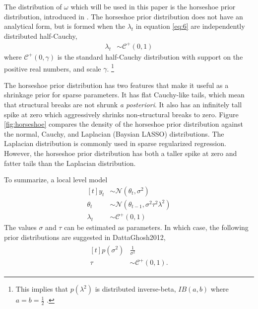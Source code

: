 \documentclass{article}
\newcommand{\paren}[1]{\ensuremath{\left(#1\right)}}
\newcommand{\dnorm}[1]{\ensuremath{\mathcal{N}\paren{#1}}}
\newcommand{\dhalfcauchy}[1]{\ensuremath{\mathcal{C}^{+}\paren{#1}}}
\begin{document}
\begin{itemize}
The distribution of $\omega$ which will be used in this paper is the horseshoe prior distribution, introduced in \textcites{CarvalhoPolsonScott2009}{CarvalhoPolsonScott2010}.
The horseshoe prior distribution does not have an analytical form, but is formed when the $\lambda_{t}$ in equation \eqref{eq:6} are independently distributed half-Cauchy,
\begin{align}
  \label{eq:13}
  \lambda_{t} &\sim \dhalfcauchy{0, 1}
\end{align}
where $\dhalfcauchy{0, \gamma}$ is the standard half-Cauchy distribution with support on the positive real numbers, and scale $\gamma$.%
\footnote{
  This implies that $p(\lambda^{2})$ is distributed inverse-beta, $IB(a, b)$ where $a = b = \frac{1}{2}$ \parencite[4]{PolsonScott2010}. 
}

The horseshoe prior distribution has two features that make it useful as a shrinkage prior for sparse parameters.
It has flat Cauchy-like tails, which mean that structural breaks are not shrunk \textit{a posteriori}.
It also has an infinitely tall spike at zero which aggressively shrinks non-structural breaks to zero.
Figure \ref{fig:horseshoe} compares the density of the horseshoe prior distribution against the normal, Cauchy, and Laplacian (Baysian LASSO) distributions.
The Laplacian distribution is commonly used in sparse regularized regression.
However, the horseshoe prior distribution has both a taller spike at zero and fatter tails than the Laplacian distribution.


To summarize, a local level model 
\begin{equation}
  \label{eq:3}
  \begin{aligned}[t]
    y_{t} & \sim \dnorm{\theta_{t}, \sigma^{2}} \\
    \theta_{t} & \sim \dnorm{\theta_{t - 1}, \sigma^{2} \tau^{2} \lambda^{2}} \\
    \lambda_{t} & \sim \dhalfcauchy{0, 1}
  \end{aligned}
\end{equation}
The values $\sigma$ and $\tau$ can be estimated as parameters. 
In which case, the following prior distributions are suggested in \textcite{CarvalhoPolsonScott2010}{DattaGhosh2012},
\begin{align}
  \label{eq:9}
  \begin{aligned}[t]
    p(\sigma^{2}) & \frac{1}{\sigma^{2}}  \\
    \tau &\sim \dhalfcauchy{0, 1} \text{.}
  \end{aligned}
\end{align}


\end{itemize}
\end{document}
